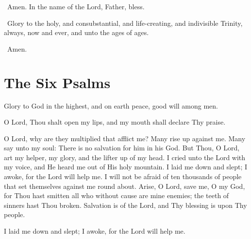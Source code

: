 \documentclass[
  14pt,
  letterpaper,
  openright,
  twocolumn,
  twoside]{memoir}
\begin{document}

\reader\ Amen. In the name of the Lord, Father, bless.

\priest\ Glory to the holy, and consubstantial, and life-creating, and indivisible Trinity, always, now and ever, and unto the ages of ages.

\reader\ Amen.

\section*{The Six Psalms}


Glory to God in the highest, and on earth peace, good will among men. \thrice\

O Lord, Thou shalt open my lips, and my mouth shall declare Thy praise. \twice\


O Lord, why are they multiplied that afflict me? Many rise up against me. Many say unto my soul: There is no salvation for him in his God. But Thou, O Lord, art my helper, my glory, and the lifter up of my head. I cried unto the Lord with my voice, and He heard me out of His holy mountain. I laid me down and slept; I awoke, for the Lord will help me. I will not be afraid of ten thousands of people that set themselves against me round about. Arise, O Lord, save me, O my God, for Thou hast smitten all who without cause are mine enemies; the teeth of sinners hast Thou broken. Salvation is of the Lord, and Thy blessing is upon Thy people.

I laid me down and slept; I awoke, for the Lord will help me.

\end{document}
